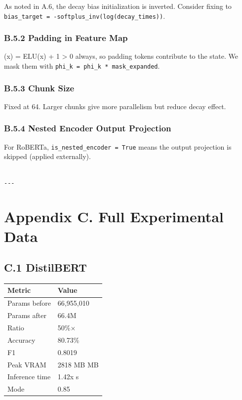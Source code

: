 As noted in A.6, the decay bias initialization is inverted. Consider 
fixing to \texttt{bias\_target = -softplus\_inv(log(decay\_times))}.

\subsubsection{B.5.2 Padding in Feature Map}

 (x) = ELU(x) + 1 \textgreater{} 0 always, so padding tokens contribute to the state. 
We mask them with \texttt{phi\_k = phi\_k * mask\_expanded}.

\subsubsection{B.5.3 Chunk Size}

Fixed at 64. Larger chunks give more parallelism but reduce decay effect.

\subsubsection{B.5.4 Nested Encoder Output Projection}

For RoBERTa, \texttt{is\_nested\_encoder = True} means the output projection is 
skipped (applied externally).
\begin{lstlisting}

---
\end{lstlisting}


\section{Appendix C. Full Experimental Data}

\subsection{C.1 DistilBERT}

\begin{table}[H]
\centering
\small
\begin{tabular}{ll}
\toprule
\textbf{Metric} & \textbf{Value} \\
\midrule
Params before & 66,955,010 \\
Params after & 66.4M \\
Ratio & 50\%$\times$ \\
Accuracy & 80.73\% \\
F1 & 0.8019 \\
Peak VRAM & 2818 MB MB \\
Inference time & 1.42x s \\
Mode & 0.85 \\
\bottomrule
\end{tabular}
\end{table}

